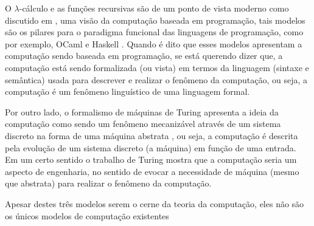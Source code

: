 O $\lambda$-cálculo e as funções recursivas são de um ponto de vista moderno como discutido em \cite{hankin2004}, uma visão da computação baseada em programação, tais modelos são os pilares para o paradigma funcional das linguagens de programação, como por exemplo, OCaml e Haskell \cite{hankin2004}. Quando é dito que esses modelos apresentam a computação sendo baseada em programação, se está querendo dizer que, a computação está sendo formalizada (ou vista) em termos da linguagem (sintaxe e semântica) usada para descrever e realizar o fenômeno da computação, ou seja, a computação é um fenômeno linguístico de uma linguagem formal. 

Por outro lado, o formalismo de máquinas de Turing apresenta a ideia da computação como sendo um fenômeno mecanizável através de um sistema discreto na forma de uma máquina abstrata \cite{sernadas2006, hankin2004}, ou seja, a computação é descrita pela evolução de um sistema discreto (a máquina) em função de uma entrada. Em um certo sentido o trabalho de Turing mostra que a computação seria um aspecto de engenharia, no sentido de evocar a necessidade de máquina (mesmo que abstrata) para realizar o fenômeno da computação.

Apesar destes três modelos serem o cerne da teoria da computação, eles não são os únicos modelos de computação existentes


